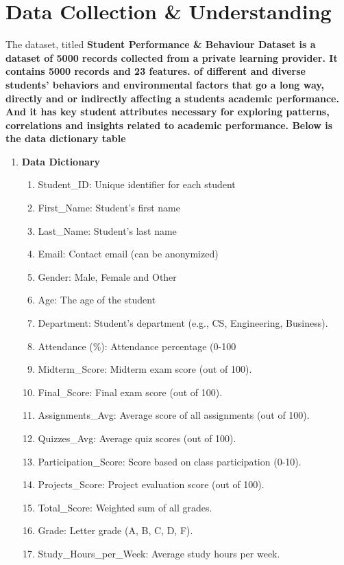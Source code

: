 \pagestyle{fancy}
\section{Data Collection \& Understanding}%
The dataset, titled \bfseries{Student Performance \& Behaviour Dataset} is a dataset of 5000 records collected from a private learning provider. It contains 5000 records and 23 features.  \cite{StudentPerformanceBehavior} of different and diverse students' behaviors and environmental factors that go a long way, directly and or indirectly affecting a students academic performance. And it has key student attributes necessary for exploring patterns, correlations and insights related to academic performance. Below is the data dictionary table 

\begin{enumerate}
	\item \textbf{Data Dictionary}
	\begin{enumerate}
		\item Student\_ID: Unique identifier for each student
		\item First\_Name: Student's first name 
		\item Last\_Name: Student's last name 
		\item Email: Contact email (can be anonymized)
		\item Gender: Male, Female and Other
		\item Age: The age of the student
		\item Department: Student's department (e.g., CS, Engineering, Business).
		\item Attendance (\%): Attendance percentage (0-100%
		\item Midterm\_Score: Midterm exam score (out of 100).
		\item Final\_Score: Final exam score (out of 100).
		\item Assignments\_Avg: Average score of all assignments (out of 100).
		\item Quizzes\_Avg: Average quiz scores (out of 100).
		\item Participation\_Score: Score based on class participation (0-10).
		\item Projects\_Score: Project evaluation score (out of 100).
		\item Total\_Score: Weighted sum of all grades.
		\item Grade: Letter grade (A, B, C, D, F).
		\item Study\_Hours\_per\_Week: Average study hours per week.

\end{enumerate}
\end{enumerate}
